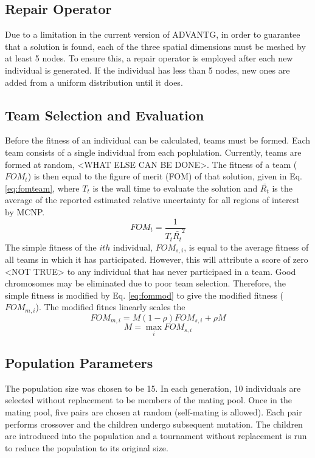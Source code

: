 \documentclass[conference]{IEEEtran}
\begin{document}
\subsection{Repair Operator}
Due to a limitation in the current version of ADVANTG, in order to guarantee that a solution is found, each of the three spatial dimensions must be meshed by at least 5 nodes. To ensure this, a repair operator is employed after each new individual is generated. If the individual has less than 5 nodes, new ones are added from a uniform distribution until it does.

\subsection{Team Selection and Evaluation}
Before the fitness of an individual can be calculated, teams must be formed. Each team consists of a single individual from each poplulation. Currently, teams are formed at random, <WHAT ELSE CAN BE DONE>. The fitness of a team ($FOM_t$) is then equal to the figure of merit (FOM) of that solution, given in Eq. \ref{eq:fomteam}, where $T_t$ is the wall time to evaluate the solution and $\bar{R_t}$ is the average of the reported estimated relative uncertainty for all regions of interest by MCNP.
\begin{equation} \label{eq:fomteam}
FOM_{t} = \frac{1}{T_t\bar{R_t}^2}
\end{equation}
The simple fitness of the $i{th}$ individual, $FOM_{s,i}$, is equal to the average fitness of all teams in which it has participated. However, this will attribute a score of zero <NOT TRUE> to any individual that has never participaed in a team. Good chromosomes may be eliminated due to poor team selection. Therefore, the simple fitness is modified by Eq. \ref{eq:fommod} to give the modified fitness ($FOM_{m,i}$). The modified fitnes linearly scales the 
\begin{equation}\label{eq:fommod}
FOM_{m,i} = M(1-\rho)FOM_{s,i} + \rho M
\end{equation}
\begin{equation}\label{eq:fommodm}
M = \max_i FOM_{s,i}
\end{equation}

\subsection{Population Parameters}
The population size was chosen to be 15. In each generation, 10 individuals are selected without replacement to be members of the mating pool. Once in the mating pool, five pairs are chosen at random (self-mating is allowed). Each pair performs crossover and the children undergo subsequent mutation. The children are introduced into the population and a tournament without replacement is run to reduce the population to its original size.
\end{document}

